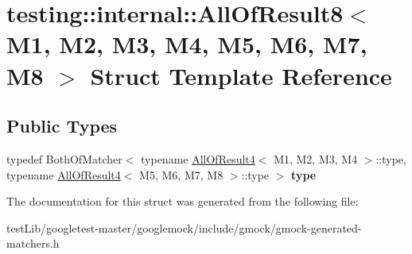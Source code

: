 \hypertarget{structtesting_1_1internal_1_1AllOfResult8}{}\section{testing\+:\+:internal\+:\+:All\+Of\+Result8$<$ M1, M2, M3, M4, M5, M6, M7, M8 $>$ Struct Template Reference}
\label{structtesting_1_1internal_1_1AllOfResult8}
\subsection*{Public Types}
\begin{DoxyCompactItemize}
\item 
\mbox{\label{structtesting_1_1internal_1_1AllOfResult8_a7103892a28c35221b9e62e871c577727}} 
typedef Both\+Of\+Matcher$<$ typename \hyperlink{structtesting_1_1internal_1_1AllOfResult4}{All\+Of\+Result4}$<$ M1, M2, M3, M4 $>$\+::type, typename \hyperlink{structtesting_1_1internal_1_1AllOfResult4}{All\+Of\+Result4}$<$ M5, M6, M7, M8 $>$\+::type $>$ {\bfseries type}
\end{DoxyCompactItemize}


The documentation for this struct was generated from the following file\+:\begin{DoxyCompactItemize}
\item 
test\+Lib/googletest-\/master/googlemock/include/gmock/gmock-\/generated-\/matchers.\+h\end{DoxyCompactItemize}

